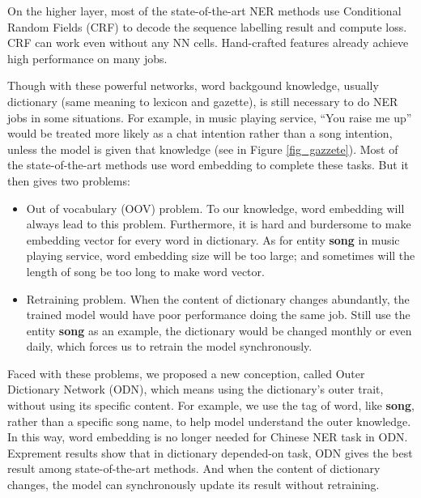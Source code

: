 \documentclass[letterpaper]{article} %
\begin{document}
On the higher layer, most of the state-of-the-art NER methods use Conditional Random Fields (CRF) \cite{crf} to decode the sequence labelling result and compute loss. CRF can work even without any NN cells. Hand-crafted features already achieve high performance \cite{stner,CRFsuite} on many jobs. 

Though with these powerful networks, word backgound knowledge, usually dictionary (same meaning to lexicon and gazette), is still necessary to do NER jobs in some situations. For example, in music playing service, ``You raise me up'' would be treated more likely as a chat intention rather than a song intention, unless the model is given that knowledge (see in Figure \ref{fig_gazzete}). Most of the state-of-the-art methods use word embedding \cite{glove,fasttext} to complete these tasks. But it then gives two problems: 

\begin{itemize}
\item Out of vocabulary (OOV) problem. To our knowledge, word embedding will always lead to this problem. Furthermore, it is hard and burdersome to make embedding vector for every word in dictionary. As for entity \textbf{song} in music playing service, word embedding size will be too large; and sometimes will the length of song be too long to make word vector. 
\item Retraining problem. When the content of dictionary changes abundantly, the trained model would have poor performance doing the same job. Still use the entity \textbf{song} as an example, the dictionary would be changed monthly or even daily, which forces us to retrain the model synchronously. 
\end{itemize}

Faced with these problems, we proposed a new conception, called Outer Dictionary Network (ODN), which means using the dictionary's outer trait, without using its specific content. For example, we use the tag of word, like \textbf{song}, rather than a specific song name, to help model understand the outer knowledge. In this way, word embedding is no longer needed for Chinese NER task in ODN. Exprement results show that in dictionary depended-on task, ODN gives the best result among state-of-the-art methods. And when the content of dictionary changes, the model can synchronously update its result without retraining.
\end{document}
